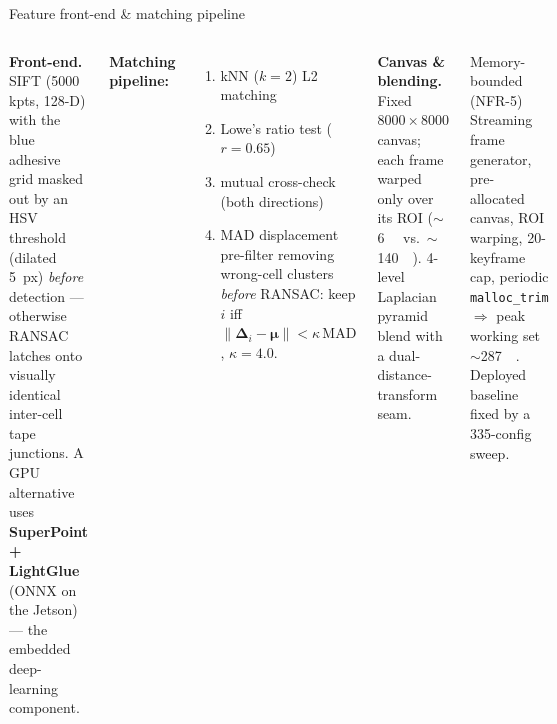 \documentclass[aspectratio=169,11pt]{beamer}
\begin{document}
\begin{frame}{Feature front-end \& matching pipeline}
\begin{columns}[T]
\footnotesize
\textbf{Front-end.} SIFT (5000 kpts, 128-D) with the blue adhesive grid masked out
by an HSV threshold (dilated \SI{5}{px}) \emph{before} detection --- otherwise RANSAC
latches onto visually identical inter-cell tape junctions. A GPU alternative uses
\textbf{SuperPoint + LightGlue} (ONNX on the Jetson) --- the embedded deep-learning
component.
\vspace{0.4em}

\textbf{Matching pipeline:}
\begin{enumerate}\footnotesize
  \item kNN ($k{=}2$) L2 matching
  \item Lowe's ratio test ($r=0.65$)
  \item mutual cross-check (both directions)
  \item \alert{MAD displacement pre-filter} removing wrong-cell clusters
        \emph{before} RANSAC: keep $i$ iff
        $\lVert\bm{\Delta}_i-\bm{\mu}\rVert<\kappa\,\mathrm{MAD}$, $\kappa=4.0$.
\end{enumerate}
\footnotesize
\textbf{Canvas \& blending.} Fixed $8000\times8000$ canvas; each frame warped only
over its ROI ($\sim$\SI{6}{\mega\byte} vs.\ $\sim$\SI{140}{\mega\byte}). 4-level
Laplacian pyramid blend with a dual-distance-transform seam.
\vspace{0.4em}

\begin{block}{Memory-bounded (NFR-5)}
Streaming frame generator, pre-allocated canvas, ROI warping, 20-keyframe cap,
periodic \texttt{malloc\_trim} $\Rightarrow$ peak working set
$\sim$\SI{287}{\mega\byte}. Deployed baseline fixed by a 335-config sweep.
\end{block}
\end{columns}
\end{frame}
\end{document}
